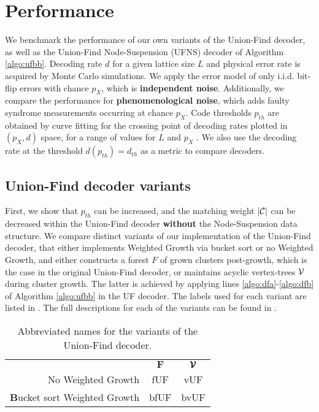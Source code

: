 \section{Performance}\label{sec:performance}

We benchmark the performance of our own variants of the Union-Find decoder, as well as the Union-Find Node-Suspension (UFNS) decoder of Algorithm \ref{algo:ufbb}. Decoding rate $d$ for a given lattice size $L$ and physical error rate is acquired by Monte Carlo simulations. We apply the error model of only i.i.d. bit-flip errors with chance $p_X$, which is \textbf{independent noise}. Additionally, we compare the performance for \textbf{phenomenological noise}, which adds faulty syndrome measurements occurring at chance $p_X$. Code thresholds $p_{th}$ are obtained by curve fitting for the crossing point of decoding rates plotted in $(p_X, d)$ space, for a range of values for $L$ and $p_X$ \cite{wang2003confinement}. We also use the decoding rate at the threshold $d(p_{th})= d_{th}$ as a metric to compare decoders. 

\subsection{Union-Find decoder variants}

First, we show that $p_{th}$ can be increased, and the matching weight $\lvert\mathcal{C}\rvert$ can be decreased within the Union-Find decoder \textbf{without} the Node-Suspension data structure. We compare distinct variants of our implementation of the Union-Find decoder, that either implements Weighted Growth via bucket sort or no Weighted Growth, and either constructs a forest $F$ of grown clusters post-growth, which is the case in the original Union-Find decoder, or maintains acyclic vertex-trees $\mathcal{V}$ during cluster growth. The latter is achieved by applying lines \ref{algo:dfa}-\ref{algo:dfb} of Algorithm \ref{algo:ufbb} in the UF decoder. The labels used for each variant are listed in . The full descriptions for each of the variants can be found in \cite{markthesis}.

\begin{table}[htbp]
  \centering
  \begin{tabularx}{\linewidth} { | R{2} || C{.5} | C{.5} | }
    \hline
    & $\mathbf{F}$ &  $\pmb{\mathcal{V}}$\\
    \hhline{|=::=:=|}
    No Weighted Growth & fUF  & vUF \\
    \hline
    \textbf{B}ucket sort Weighted Growth & bfUF & bvUF \\
    \hline
  \end{tabularx}
  \caption{Abbreviated names for the variants of the Union-Find decoder.}\label{tab:uftable}
\end{table}

